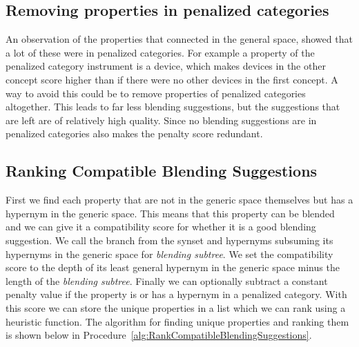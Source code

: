 \subsection{Removing properties in penalized categories}
An observation of the properties that connected in the general space, showed that a lot of these were in penalized categories. For example a property of the penalized category instrument is a device, which makes devices in the other concept score higher than if there were no other devices in the first concept. A way to avoid this could be to remove properties of penalized categories altogether. This leads to far less blending suggestions, but the suggestions that are left are of relatively high quality. Since no blending suggestions are in penalized categories also makes the penalty score redundant.

\subsection{Ranking Compatible Blending Suggestions}
First we find each property that are not in the generic space themselves but has a hypernym in the generic space. This means that this property can be blended and we can give it a compatibility score for whether it is a good blending suggestion. We call the branch from the synset and hypernyms subsuming its hypernyms in the generic space for \emph{blending subtree}. We set the compatibility score to the depth of its least general hypernym in the generic space minus the length of the \emph{blending subtree}. Finally we can optionally subtract a constant penalty value if the property is or has a hypernym in a penalized category. With this score we can store the unique properties in a list which we can rank using a heuristic function. The algorithm for finding unique properties and ranking them is shown below in Procedure~\ref{alg:RankCompatibleBlendingSuggestions}.

